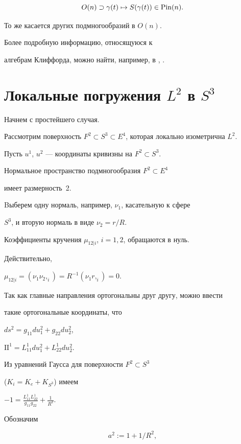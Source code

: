 $$


O(n) \supset \gamma(t) \mapsto S(\gamma(t)) \in \Pin(n).


$$


То же касается других подмногообразий в $O(n)$.


Более подробную информацию, относящуюся к


алгебрам Клиффорда, можно найти, например, в \cite{BT}, \cite{Po}.








\section{Локальные погружения $L^2$ в $S^3$} \label{L2}





Начнем с простейшего случая.


Рассмотрим поверхность $F^2 \subset S^3


\subset E^4$, которая локально изометрична $L^2$.


Пусть $u^1$, $u^2$ --- координаты кривизны на $F^2\subset S^3$.


Нормальное пространство подмногообразия $F^2\subset E^4$


имеет размерность~2.


Bыберем одну нормаль, например, $\nu_1$, касательную к сфере


$S^3$, и вторую нормаль в виде $\nu_2 = r/R$.


Коэффициенты кручения $\mu_{12|i}$, $i=1,2$, обращаются в нуль.


Действительно,


$\mu_{12|i} = (\nu_1 \nu_2,_i) = R^{-1} (\nu_1 r,_i) = 0$.


Так как главные направления ортогональны друг другу, можно ввести 


такие ортогональные координаты, что


$ds^2 = g_{11} du_1^2 + g_{22} du_2^2$,


$\mathrm{II}^1 = L_{11}^1 du_1^2 + L_{22}^1 du_2^2$.


Из уравнений Гаусса для поверхности $F^2 \subset S^3$


($K_i = K_e + K_{S^3}$) имеем


$-1 = \frac{L_{11}^1 L_{22}^1}{g_{11} g_{22}} + \frac{1}{R^2}$.


Обозначим


\begin{equation} \label{a2}


a^2 := 1 + {1}/{R^2},


\end{equation}


